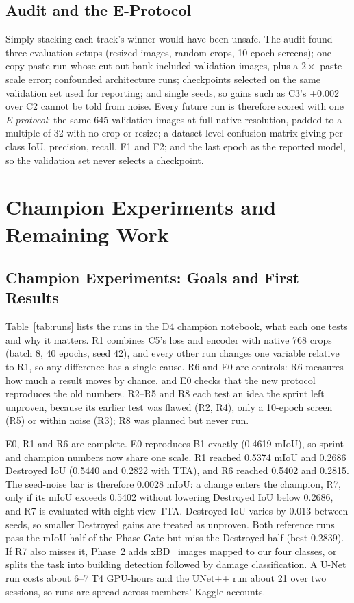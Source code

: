 \documentclass[conference]{IEEEtran}
\begin{document}
\subsection{Audit and the E-Protocol}
Simply stacking each track's winner would have been unsafe. The audit found three evaluation setups (resized images, random crops, 10-epoch screens); one copy-paste run whose cut-out bank included validation images, plus a $2\times$ paste-scale error; confounded architecture runs; checkpoints selected on the same validation set used for reporting; and single seeds, so gains such as C3's +0.002 over C2 cannot be told from noise. Every future run is therefore scored with one \textit{E-protocol}: the same 645 validation images at full native resolution, padded to a multiple of 32 with no crop or resize; a dataset-level confusion matrix giving per-class IoU, precision, recall, F1 and F2; and the last epoch as the reported model, so the validation set never selects a checkpoint.

\section{Champion Experiments and Remaining Work}
\subsection{Champion Experiments: Goals and First Results}
Table~\ref{tab:runs} lists the runs in the D4 champion notebook, what each one tests and why it matters. R1 combines C5's loss and encoder with native 768 crops (batch 8, 40 epochs, seed 42), and every other run changes one variable relative to R1, so any difference has a single cause. R6 and E0 are controls: R6 measures how much a result moves by chance, and E0 checks that the new protocol reproduces the old numbers. R2--R5 and R8 each test an idea the sprint left unproven, because its earlier test was flawed (R2, R4), only a 10-epoch screen (R5) or within noise (R3); R8 was planned but never run.

E0, R1 and R6 are complete. E0 reproduces B1 exactly (0.4619 mIoU), so sprint and champion numbers now share one scale. R1 reached 0.5374 mIoU and 0.2686 Destroyed IoU (0.5440 and 0.2822 with TTA), and R6 reached 0.5402 and 0.2815. The seed-noise bar is therefore 0.0028 mIoU: a change enters the champion, R7, only if its mIoU exceeds 0.5402 without lowering Destroyed IoU below 0.2686, and R7 is evaluated with eight-view TTA. Destroyed IoU varies by 0.013 between seeds, so smaller Destroyed gains are treated as unproven. Both reference runs pass the mIoU half of the Phase Gate but miss the Destroyed half (best 0.2839). If R7 also misses it, Phase~2 adds xBD~\cite{xbd} images mapped to our four classes, or splits the task into building detection followed by damage classification. A U-Net run costs about 6--7 T4 GPU-hours and the UNet++ run about 21 over two sessions, so runs are spread across members' Kaggle accounts.
\end{document}

